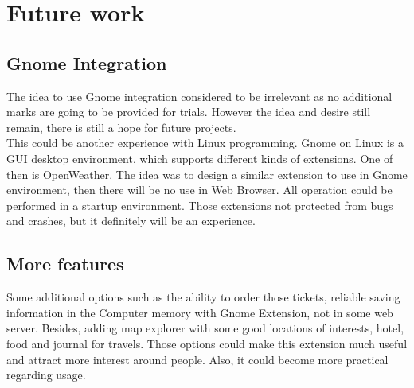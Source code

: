 \documentclass[12pt]{article}
\numberwithin{equation}{section} %
\numberwithin{figure}{section} %
\numberwithin{table}{section} %
\begin{document}
\section{Future work}
	\subsection{Gnome Integration}
		The idea to use Gnome integration considered to be irrelevant as no additional marks are going to be provided for trials. However the idea and desire still remain, there is still a hope for future projects. \\
		This could be another experience with Linux programming. Gnome on Linux is a GUI desktop environment, which supports different kinds of extensions. One of then is OpenWeather. The idea was to design a similar extension to use in Gnome environment, then there will be no use in Web Browser. All operation could be performed in a startup environment. Those extensions not protected from bugs and crashes, but it definitely will be an experience.
	\subsection{More features}
		Some additional options such as the ability to order those tickets, reliable saving information in the Computer memory with Gnome Extension, not in some web server. Besides, adding map explorer with some good locations of interests, hotel, food and journal for travels. Those options could make this extension much useful and attract more interest around people. Also, it could become more practical regarding usage.
\end{document}
